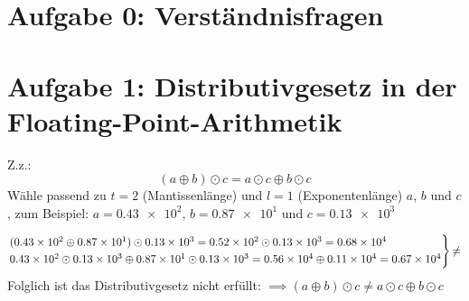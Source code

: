 



\maketitle

\section*{Aufgabe 0: Verständnisfragen}

\section*{Aufgabe 1: Distributivgesetz in der Floating-Point-Arithmetik}
Z.z.:
\begin{equation*}
  (a \oplus b) \odot c = a \odot c \oplus b \odot c
\end{equation*}
\noindent
Wähle passend zu $t=2$ (Mantissenlänge) und $l=1$ (Exponentenlänge) $a$, $b$ und $c$,
zum Beispiel: $a=\num{0,43e2}$, $b=\num{0,87e1}$ und $c=\num{0,13e3}$

\begin{align*}
\begin{rcases}
  (\num{0,43e2} \oplus \num{0,87e1}) \odot \num{0,13e3}
  = \num{0,52e2} \odot \num{0,13e3}
  = \num{0,68e4} \\
  \num{0,43e2} \odot \num{0,13e3} \oplus \num{0,87e1} \odot  \num{0,13e3}
  = \num{0,56e4} \oplus \num{0,11e4}
  = \num{0,67e4}
\end{rcases}
{\ne}
\end{align*}
\noindent
Folglich ist das Distributivgesetz  nicht erfüllt:
$\implies (a \oplus b) \odot c \ne a \odot c \oplus b \odot c$

